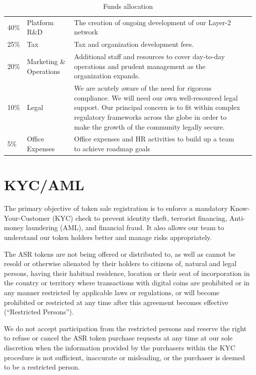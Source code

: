 \begin{table}[H]
\begin{tabular}{llp{}l}
  40\% & Platform R\&D & The creation of ongoing development of our Layer-2 network \\
  25\% & Tax & Tax and organization development fees.\\
  20\% & Marketing \& Operations & Additional staff and resources to cover day-to-day operations and prudent management as the organization expands. \\
  10\% & Legal & We are acutely aware of the need for rigorous compliance. We will need our own well-resourced legal support. Our principal concern is to fit within complex regulatory frameworks across the globe in order to make the growth of the community legally secure. \\

  5\% & Office Expenses & Office expenses and HR activities to build up
        a team to achieve roadmap goals
\end{tabular}
\caption{\label{tab:table-name}Funds allocation}
\end{table}

\section{KYC/AML}

The primary objective of token sale registration is to enforce a mandatory Know-Your-Customer (KYC) check to prevent identity theft, terrorist financing, Anti-money laundering (AML), and financial fraud. It also allows our team to understand our token holders better and manage risks appropriately.

The ASR tokens are not being offered or distributed to, as well as cannot be resold or otherwise alienated by their holders to citizens of, natural and legal persons, having their habitual residence, location or their seat of incorporation in the country or territory where transactions with digital coins are prohibited or in any manner restricted by applicable laws or regulations, or will become prohibited or restricted at any time after this agreement becomes effective (“Restricted Persons”).

We do not accept participation from the restricted persons and reserve the right to refuse or cancel the ASR token purchase requests at any time at our sole discretion when the information provided by the purchasers within the KYC procedure is not sufficient, inaccurate or misleading, or the purchaser is deemed to be a restricted person.


